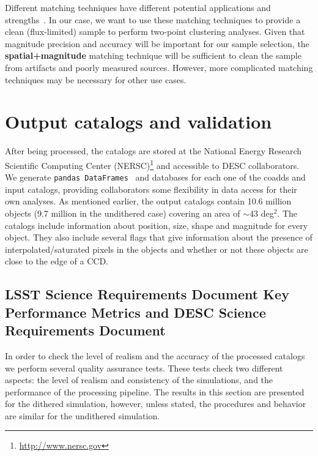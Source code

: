 \documentclass[\docopts]{\docclass}
\begin{document}
Different matching techniques have different potential applications and strengths~\citep{doi:10.1146/annurev-statistics-010814-020231}. In our case, we want to use these matching techniques to provide a clean (flux-limited) sample to perform two-point clustering analyses. Given that magnitude precision and accuracy will be important for our sample selection, the \textbf{spatial+magnitude} matching technique will be sufficient to clean the sample from artifacts and poorly measured sources. However, more complicated matching techniques may be necessary for other use cases.
 
 
\section{Output catalogs and validation}
\label{sec:catalogs}
After being processed, the catalogs are stored at the National Energy Research Scientific Computing Center (NERSC)\footnote{\url{http://www.nersc.gov}} and accessible to DESC collaborators. We generate \texttt{pandas
DataFrames}~\citep{mckinney-proc-scipy-2010} and databases for each one of the coadds and input catalogs, providing collaborators some flexibility in data access for their own analyses. As mentioned earlier, the output catalogs contain 10.6 million objects (9.7 million in the undithered case) covering an area
of $\sim$43 deg$^{2}$. The catalogs include information about position, size, shape and magnitude for every object. They also include several flags that give information about the presence of interpolated/saturated pixels in the objects and whether or not these objects are close to the edge of a CCD.

\subsection{LSST Science Requirements Document Key Performance Metrics and DESC Science Requirements Document}

In order to check the level of realism and the accuracy of the processed catalogs we perform several quality assurance tests. These tests check two different aspects: the level of realism and consistency of the simulations, and the performance of the processing pipeline. The results in this section are presented for the dithered simulation, however, unless stated, the procedures and behavior are similar for the undithered simulation.
\end{document}
